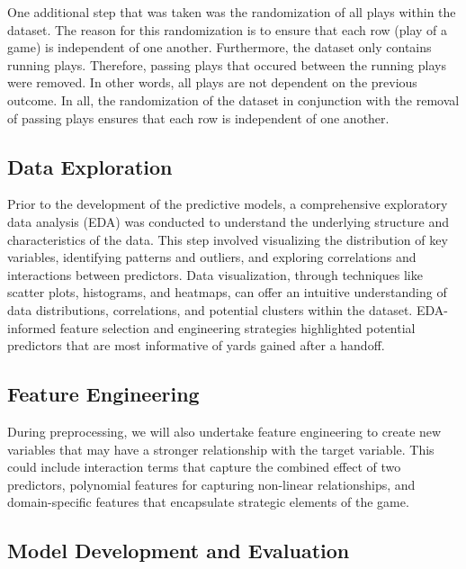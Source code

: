 \documentclass[
  super,
  preprint,
  3p]{elsarticle}
\begin{document}
One additional step that was taken was the randomization of all plays
within the dataset. The reason for this randomization is to ensure that
each row (play of a game) is independent of one another. Furthermore,
the dataset only contains running plays. Therefore, passing plays that
occured between the running plays were removed. In other words, all
plays are not dependent on the previous outcome. In all, the
randomization of the dataset in conjunction with the removal of passing
plays ensures that each row is independent of one another.

\hypertarget{data-exploration}{%
\subsection{Data Exploration}\label{data-exploration}}

Prior to the development of the predictive models, a comprehensive
exploratory data analysis (EDA) was conducted to understand the
underlying structure and characteristics of the data. This step involved
visualizing the distribution of key variables, identifying patterns and
outliers, and exploring correlations and interactions between
predictors. Data visualization, through techniques like scatter plots,
histograms, and heatmaps, can offer an intuitive understanding of data
distributions, correlations, and potential clusters within the dataset.
EDA-informed feature selection and engineering strategies highlighted
potential predictors that are most informative of yards gained after a
handoff.

\hypertarget{feature-engineering}{%
\subsection{Feature Engineering}\label{feature-engineering}}

During preprocessing, we will also undertake feature engineering to
create new variables that may have a stronger relationship with the
target variable. This could include interaction terms that capture the
combined effect of two predictors, polynomial features for capturing
non-linear relationships, and domain-specific features that encapsulate
strategic elements of the game.

\hypertarget{model-development-and-evaluation}{%
\subsection{Model Development and
Evaluation}\label{model-development-and-evaluation}}
\end{document}
